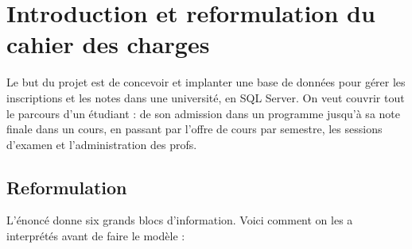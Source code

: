 \documentclass[11pt,a4paper]{article}
\begin{document}
\section{Introduction et reformulation du cahier des charges}

Le but du projet est de concevoir et implanter une base de données pour
gérer les inscriptions et les notes dans une université, en SQL Server.
On veut couvrir tout le parcours d'un étudiant : de son admission dans
un programme jusqu'à sa note finale dans un cours, en passant par
l'offre de cours par semestre, les sessions d'examen et l'administration
des profs.

\subsection{Reformulation}

L'énoncé donne six grands blocs d'information. Voici comment on les a
interprétés avant de faire le modèle :
\end{document}
